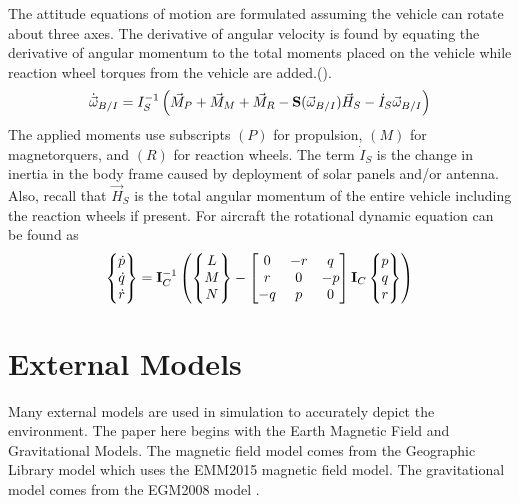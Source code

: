\documentclass{article}
\begin{document}
The attitude equations of motion are formulated assuming the vehicle
can rotate about three axes. The derivative of
angular velocity is found by equating the derivative of angular momentum
to the total moments placed on the vehicle while reaction wheel
torques from the vehicle are added.(\cite{etkins}).
\begin{equation}\label{e:pqrdot}
  \dot{\vec{\omega}}_{B/I} = I_S^{-1}\left( \vec{M}_P + \vec{M}_{M} +
  \vec{M}_R - {\bf S}(\vec{\omega}_{B/I}) \vec{H}_{S} - \dot{I}_S\vec{\omega}_{B/I}\right)
\end{equation}
The applied moments use subscripts $(P)$ for propulsion, $(M)$ for
magnetorquers, and $(R)$ for reaction wheels. The term $\dot{I}_S$ is the change in
inertia in the body frame caused by deployment of solar panels and/or
antenna. Also, recall that $\vec{H}_S$ is the total angular momentum
of the entire vehicle including the reaction wheels if present. For
aircraft the rotational dynamic equation can be found as
\begin{equation}\label{e:pqrdot} 
\begin{Bmatrix} \dot{p} \\ \dot{q} \\ \dot{r} \end{Bmatrix} = {\bf I}_C^{-1}\left(
\begin{Bmatrix} L\\M\\N\end{Bmatrix}-\begin{bmatrix} 0 & -r
& q \\ r & 0 & -p \\ -q & p & 0 \end{bmatrix} {\bf I}_C\begin{Bmatrix} p\\q\\r\end{Bmatrix}\right)
\end{equation}

\section{External Models}

Many external models are used in simulation to accurately depict the
environment. The paper here begins with the Earth Magnetic Field
and Gravitational Models. The magnetic field model comes from the Geographic
Library model which uses the EMM2015 magnetic field model. The
gravitational model comes from the EGM2008 model
\cite{GeographicLib}. 
\end{document}
